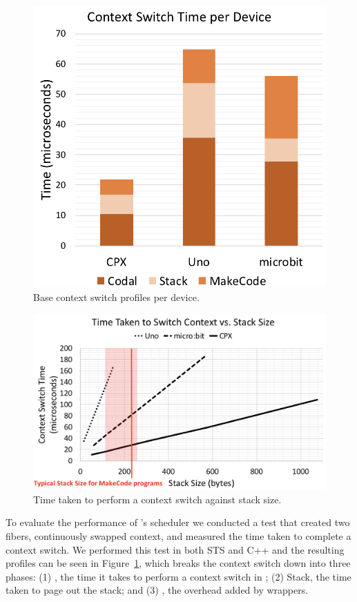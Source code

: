 \begin{figure}[ht]
    \includegraphics[width=.8\columnwidth]{images/context-switch.png}
\caption{\label{fig:context-switch}Base context switch profiles per device.}
\end{figure}

\begin{figure}[ht]
    \includegraphics[width=\columnwidth]{images/context-vs-stack.png}
\caption{\label{fig:context-vs-stack}Time taken to perform a context switch against stack size.}
\end{figure}

To evaluate the performance of \CON's scheduler we conducted a test that created two fibers, continuously swapped context, and measured the time taken to complete a context switch.
We performed this test in both STS and C++ and the resulting profiles can be seen in Figure~\ref{fig:context-switch}, which
breaks the context switch down into three phases:
(1) \CON, the time it takes to perform a context switch in \CON;
(2) Stack, the time taken to page out the \MC stack; and
(3) \MCN, the overhead added by \MC wrappers.

